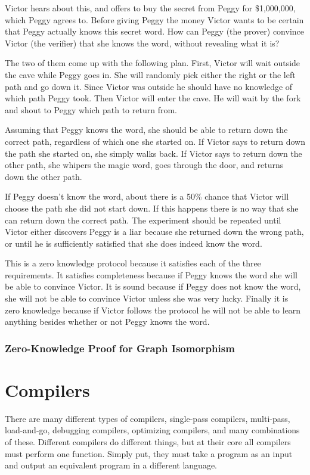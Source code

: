 \documentclass{sig-alternate}
\begin{document}
	Victor hears about this, and offers to buy the secret from Peggy for
	\$1,000,000, which Peggy agrees to. Before giving Peggy the money Victor
	wants to be certain that Peggy actually knows this secret word. How can
	Peggy (the prover) convince Victor (the verifier) that she knows the
	word, without revealing what it is?

	The two of them come up with the following plan. First, Victor will wait
	outside the cave while Peggy goes in. She will randomly pick either the
	right or the left path and go down it. Since Victor was outside he
	should have no knowledge of which path Peggy took. Then Victor will
	enter the cave. He will wait by the fork and shout to Peggy which
	path to return from. 
	
	Assuming that Peggy knows the word, she should be able to return down
	the correct path, regardless of which one she started on. If Victor 
	says to	return down the path she started on, she simply walks back. 
	If Victor says to return down the other path, she whipers the magic
	word, goes through the door, and returns down the other path.

	If Peggy doesn't know the word, about there is a 50\% chance that Victor
	will choose the path she did not start down. If this happens there is
	no way that she can return down the correct path. The experiment should
	be repeated until Victor either discovers Peggy is a liar because she
	returned down the wrong path, or until he is sufficiently satisfied
	that she does indeed know the word.

	This is a zero knowledge protocol because it satisfies each of the three
	requirements. It satisfies completeness because	if Peggy knows the word
	she will be able to convince Victor. It is sound because if Peggy does not 
	know the word, she will not be able to convince Victor unless she was very
	lucky. Finally it is zero knowledge because if Victor follows the protocol
	he will not be able to learn anything besides whether or not Peggy knows 
	the word.

	\subsubsection{Zero-Knowledge Proof for Graph Isomorphism}

\section{Compilers}
	There are many different types of compilers, single-pass compilers, multi-pass,
	load-and-go, debugging compilers, optimizing compilers, and many combinations
	of these. Different compilers do different things, but at their core all 
	compilers must perform one function. Simply put, they must take a program as 
	an input and output	an equivalent program in a different
	language.~\cite{Compiler:1986} 
	
\end{document}
